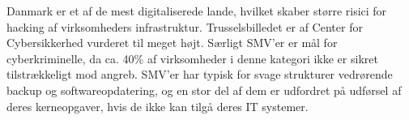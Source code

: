 Danmark er et af de mest digitaliserede lande, hvilket skaber større risici for hacking af virksomheders infrastruktur. Trusselsbilledet er af Center for Cybersikkerhed vurderet til meget højt. Særligt SMV'er er mål for cyberkriminelle, da ca. 40\% af virksomheder i denne kategori ikke er sikret tilstrækkeligt mod angreb.  SMV'er har typisk for svage strukturer vedrørende backup og softwareopdatering, og en stor del af dem er udfordret på udførsel af deres kerneopgaver, hvis de ikke kan tilgå deres IT systemer.\cite{Digital_SMV_2024} \\